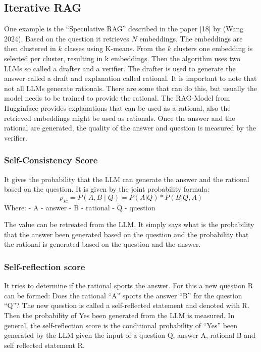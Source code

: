 \documentclass[11pt]{wseas}
\begin{document}
\subsection{Iterative RAG}\label{iterative-rag}

One example is the ``Speculative RAG'' described in the paper {[}18{]}
by (Wang 2024). Based on the question it retrieves \(N\) embeddings. The
embeddings are then clustered in \(k\) classes using K-means. From the
\(k\) clusters one embedding is selected per cluster, resulting in k
embeddings. Then the algorithm uses two LLMs so called a drafter and a
verifier. The drafter is used to generate the answer called a draft and
explanation called rational. It is important to note that not all LLMs
generate rationals. There are some that can do this, but usually the
model needs to be trained to provide the rational. The RAG-Model from
Hugginface provides explanations that can be used as a rational, also
the retrieved embeddings might be used as rationals. Once the answer and
the rational are generated, the quality of the answer and question is
measured by the verifier.

\subsubsection{Self-Consistency Score}\label{self-consistency-score}

It gives the probability that the LLM can generate the answer and the
rational based on the question. It is given by the joint probability
formula: \[
ρ_{sc} = P(A,B∣Q) = P(A|Q) * P(B|Q,A) 
\] Where: - A - answer - B - rational - Q - question

The value can be retreated from the LLM. It simply says what is the
probability that the answer been generated based on the question and the
probability that the rational is generated based on the question and the
answer.

\subsubsection{Self-reflection score}\label{self-reflection-score}

It tries to determine if the rational sports the answer. For this a new
question R can be formed: Does the rational ``A'' sports the answer
``B'' for the question ``Q''? The new question is called a
self-reflected statement and denoted with R. Then the probability of Yes
been generated from the LLM is measured. In general, the self-reflection
score is the conditional probability of ``Yes'' been generated by the
LLM given the input of a question Q, answer A, rational B and self
reflected statement R.
\end{document}
